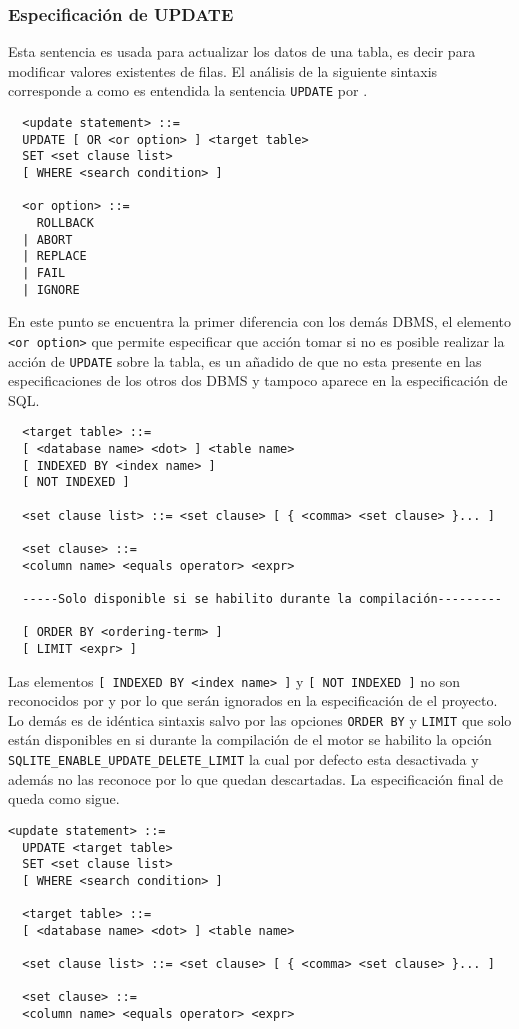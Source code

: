 \subsubsection{Especificación de UPDATE} 
\label{especificacion:dialectos:update}
Esta sentencia es usada para actualizar los datos de una tabla, es decir para modificar valores existentes de filas. El análisis de la siguiente sintaxis corresponde a como es entendida la sentencia \verb=UPDATE= por \s\cite{sqlite:sql}.
%
\begin{Verbatim}
  <update statement> ::=
  UPDATE [ OR <or option> ] <target table> 
  SET <set clause list>
  [ WHERE <search condition> ]
  
  <or option> ::=
    ROLLBACK
  | ABORT
  | REPLACE
  | FAIL
  | IGNORE
\end{Verbatim}
%
En este punto se encuentra la primer diferencia con los demás DBMS, el elemento \verb=<or option>= que permite especificar que acción tomar si no es posible realizar la acción de \verb=UPDATE= sobre la tabla, es un añadido de \s que no esta presente en las especificaciones de los otros dos DBMS y tampoco aparece en la especificación de SQL.
%
\begin{Verbatim}
  <target table> ::=
  [ <database name> <dot> ] <table name>
  [ INDEXED BY <index name> ]
  [ NOT INDEXED ]
  
  <set clause list> ::= <set clause> [ { <comma> <set clause> }... ]

  <set clause> ::=
  <column name> <equals operator> <expr>
  
  -----Solo disponible si se habilito durante la compilación---------
  
  [ ORDER BY <ordering-term> ]
  [ LIMIT <expr> ]

\end{Verbatim}
%
Las elementos \verb=[ INDEXED BY <index name> ]= y \verb=[ NOT INDEXED ]= no son reconocidos por \m y \p por lo que serán ignorados en la especificación de el proyecto. Lo demás es de idéntica sintaxis salvo por las opciones \verb=ORDER BY= y \verb=LIMIT= que solo están disponibles en \s si durante la compilación de el motor se habilito la opción \verb=SQLITE_ENABLE_UPDATE_DELETE_LIMIT= la cual por defecto esta desactivada y además \p no las reconoce por lo que quedan descartadas. La especificación final de \jj queda como sigue.
%
\begin{Verbatim}[frame=single, label=sintaxis para UPDATE]
  <update statement> ::=
  UPDATE <target table> 
  SET <set clause list>
  [ WHERE <search condition> ]
  
  <target table> ::=
  [ <database name> <dot> ] <table name>
  
  <set clause list> ::= <set clause> [ { <comma> <set clause> }... ]

  <set clause> ::=
  <column name> <equals operator> <expr>    
\end{Verbatim}
%
%
%
%
